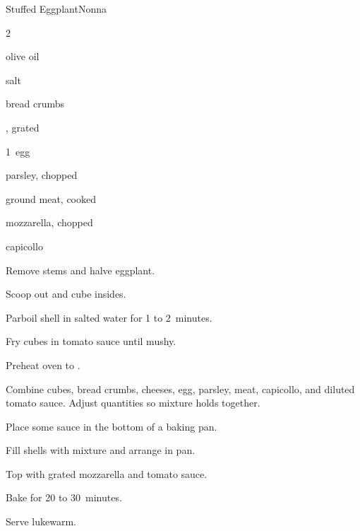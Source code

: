 \begin{recipe}{Stuffed Eggplant}{Nonna}{}

\begin{ingredients}
\item 2~
\item {}
\item olive oil
\item salt
\item bread crumbs
\item {}, grated
\item 1~egg
\item parsley, chopped
\item ground meat, cooked
\item mozzarella, chopped
\item capicollo
\end{ingredients}

\begin{directions}
\item Remove stems and halve eggplant.
\item Scoop out and cube insides.
\item Parboil shell in salted water for 1 to 2~minutes.
\item Fry cubes in tomato sauce until mushy.
\item Preheat oven to .
\item Combine cubes, bread crumbs, cheeses, egg, parsley, meat, capicollo, and diluted tomato sauce. Adjust quantities so mixture holds together.
\item Place some sauce in the bottom of a baking pan.
\item Fill shells with mixture and arrange in pan.
\item Top with grated mozzarella and tomato sauce.
\item Bake for 20 to 30~minutes.
\item Serve lukewarm.
\end{directions}

\end{recipe}

